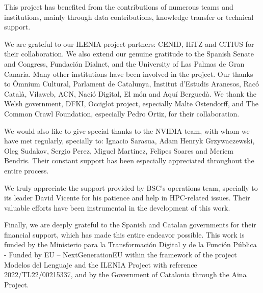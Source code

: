 
This project has benefited from the contributions of numerous teams and institutions, mainly through data contributions, knowledge transfer or technical support.

We are grateful to our ILENIA project partners: CENID, HiTZ and CiTIUS for their collaboration. We also extend our genuine gratitude to the Spanish Senate and Congress, Fundación Dialnet, and the University of Las Palmas de Gran Canaria. Many other institutions have been involved in the project. Our thanks to Òmnium Cultural, Parlament de Catalunya, Institut d'Estudis Aranesos, Racó Català, Vilaweb, ACN, Nació Digital, El món and Aquí Berguedà. We thank the Welsh government, DFKI, Occiglot project, especially Malte Ostendorff, and The Common Crawl Foundation, especially Pedro Ortiz, for their collaboration.

We would also like to give special thanks to the NVIDIA team, with whom we have met regularly, specially to: Ignacio Sarasua, Adam Henryk Grzywaczewski, Oleg Sudakov, Sergio Perez, Miguel Martinez, Felipes Soares and Meriem Bendris. Their constant support has been especially appreciated throughout the entire process.

We truly appreciate the support provided by BSC’s operations team, specially to its leader David Vicente for his patience and help in HPC-related issues. Their valuable efforts have been instrumental in the development of this work.

Finally, we are deeply grateful to the Spanish and Catalan governments for their financial support, which has made this entire endeavor possible. This work is funded by the Ministerio para la Transformación Digital y de la Función Pública - Funded by EU – NextGenerationEU within the framework of the project Modelos del Lenguaje and the ILENIA Project with reference 2022/TL22/00215337, and by the Government of Catalonia through the Aina Project. 